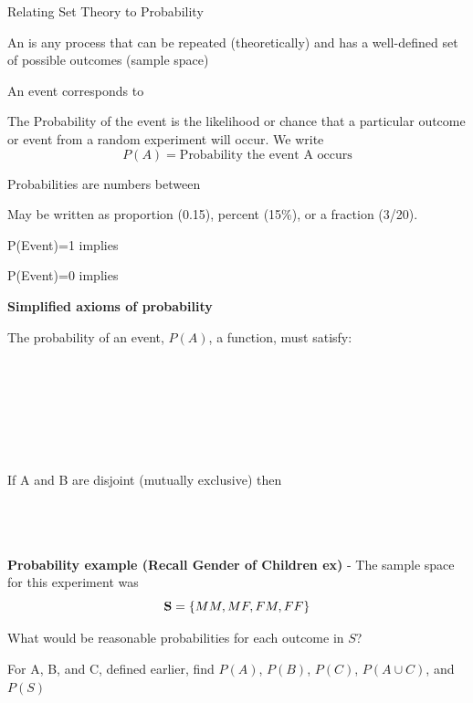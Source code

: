 \huge Relating Set Theory to Probability \\\normalsize
\bi
\item An \underbar{~~~~~~~~~~~~~~~~~~~~~~~~~~} is any process that can be repeated (theoretically) and has a well-defined set of possible outcomes (sample space)\\
\item An event corresponds to \underbar{~~~~~~~~~~~~~~~~~~~~~~~~~~~~~~~~~~~~~~~~~~~~~~~~~~~~~~~~~~~~~~~~~~}
\item The Probability of the event is the likelihood or chance that a particular outcome or event from a random experiment will occur.  We write 
$$P(A) = \mbox{Probability the event A occurs}$$
\item Probabilities are numbers between \underbar{~~~~~~~~~~~~~~~~~~~~~~~~~~~~~~~~~~~~~~~~~~~~~~~~~~}
\item May be written as proportion (0.15), percent (15\%), or a fraction (3/20).\\
\item P(Event)=1 implies \underbar{~~~~~~~~~~~~~~~~~~~~~~~~~~~~~~~~~~~~~~~~~~~~~~~~~~~~~~~~~~~~~~~~~~~~~~~~~~~~}\\
\item P(Event)=0 implies \underbar{~~~~~~~~~~~~~~~~~~~~~~~~~~~~~~~~~~~~~~~~~~~~~~~~~~~~~~~~~~~~~~~~~~~~~~~~~~~~}\\
\ei

\large\textbf{Simplified axioms of probability}\normalsize\\
\bi
\item The probability of an event, $P(A)$, a function, must satisfy:\\~\\~\\
\underbar{~~~~~~~~~~~~~~~~~~~~~~~~~~~~~~~~~~~~~~~~~~~~~~~~~~~~~~~~~~~~~~~~~~~~~}\\~\\~\\
\underbar{~~~~~~~~~~~~~~~~~~~~~~~~~~~~~~~~~~~~~~~~~~~~~~~~~~~~~~~~~~~~~~~~~~~~~}\\~\\
If A and B are disjoint (mutually exclusive) then\\~\\~\\
\underbar{~~~~~~~~~~~~~~~~~~~~~~~~~~~~~~~~~~~~~~~~~~~~~~~~~~~~~~~~~~~~~~~~~~~~~}\\
\ei

\textbf{Probability example (Recall Gender of Children ex)} - The sample space for this experiment was
$$\mbox{\textbf{S}}=\left\{MM, MF, FM, FF\right\}$$
\be
\item What would be reasonable probabilities for each outcome in $S$?\\
\item For A, B, and C, defined earlier, find $P(A)$, $P(B)$, $P(C)$, $P(A\cup C)$, and $P(S)$
\ee

